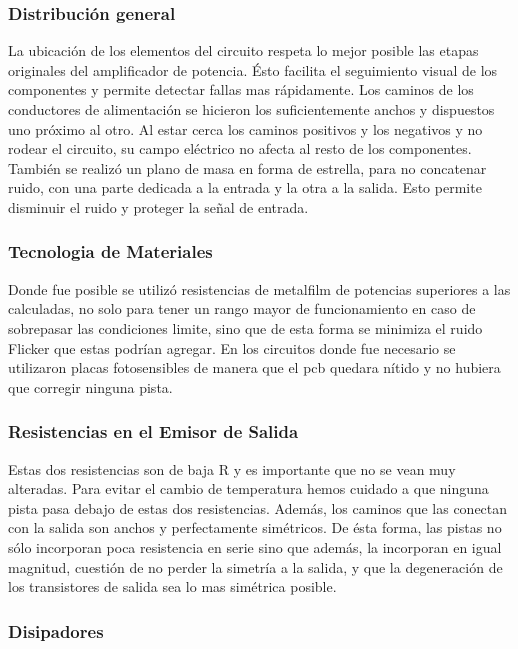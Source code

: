 \subsubsection*{Distribución general}
La ubicación de los elementos del circuito respeta lo mejor posible las etapas originales del amplificador de potencia. Ésto facilita el seguimiento visual de los componentes y permite detectar fallas mas rápidamente.
Los caminos de los conductores de alimentación se hicieron los suficientemente anchos y dispuestos uno próximo al otro. Al estar cerca los caminos positivos y los negativos y no rodear el circuito, su campo eléctrico no afecta al resto de los componentes.
También se realizó un plano de masa en forma de estrella, para no concatenar ruido, con una parte dedicada a la entrada y la otra a la salida. Esto permite disminuir el ruido y proteger la señal de entrada.
\bigskip
\subsubsection*{Tecnologia de Materiales}

Donde fue posible se utilizó resistencias de metalfilm de potencias superiores a las calculadas, no solo para tener un rango mayor de funcionamiento en caso de sobrepasar las condiciones limite, sino que de esta forma se minimiza el ruido Flicker que estas podrían agregar.
En los circuitos donde fue necesario se utilizaron placas fotosensibles de manera que el pcb quedara nítido y no hubiera que corregir ninguna pista.

\bigskip
\subsubsection*{Resistencias en el Emisor de Salida}
Estas dos resistencias son de baja R y es importante que no se vean muy alteradas. Para evitar el cambio de temperatura hemos cuidado a que ninguna pista pasa debajo de estas dos resistencias. Además, los caminos que las conectan con la salida son anchos y perfectamente simétricos. De ésta forma, las pistas no sólo incorporan poca resistencia en serie sino que además, la incorporan en igual magnitud, cuestión de no perder la simetría a la salida, y que la degeneración de los transistores de salida sea lo mas simétrica posible.
\bigskip

\subsubsection{Disipadores}

